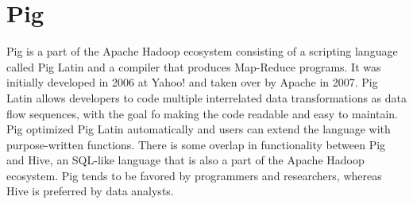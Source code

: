 \section{Pig}

Pig is a part of the Apache Hadoop
ecosystem consisting of a scripting language called Pig
Latin and a compiler that produces
Map-Reduce programs. It was initially developed in
2006 at Yahoo! and taken over by Apache in
2007\cite{hid-sp18-419-die2015datascience}. Pig Latin allows
developers to code multiple interrelated data transformations as data
flow sequences, with the goal fo making the code readable and easy to
maintain. Pig optimized Pig Latin automatically and users can extend
the language with purpose-written
functions\cite{hid-sp18-419-www-pig}. There is some overlap in
functionality between Pig and Hive, an SQL-like
language that is also a part of the Apache Hadoop ecosystem. Pig tends
to be favored by programmers and researchers, whereas Hive is
preferred by data analysts\cite{hid-sp18-419-www-dezyre-pig}.
